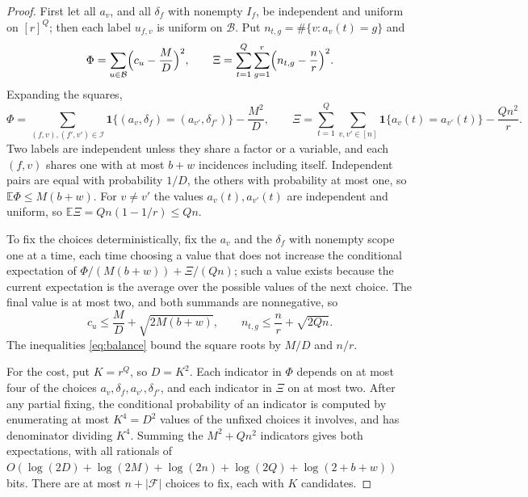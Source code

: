 \documentclass[11pt,reqno]{amsart}
\numberwithin{equation}{section}
\theoremstyle{plain}
\theoremstyle{definition}
\theoremstyle{remark}
\newcommand{\F}{\mathcal{F}}
\newcommand{\B}{\mathcal{B}}
\begin{document}
\begin{proof}
First let all $a_v$, and all $\delta_f$ with nonempty $I_f$, be independent and
uniform on $[r]^{Q}$; then each label $u_{f,v}$ is uniform on $\B$. Put
$n_{t,g}=\#\{v:a_v(t)=g\}$ and
\[
  \Phi=\sum_{u\in\B}\Bigl(c_u-\frac MD\Bigr)^2,\qquad
  \Xi=\sum_{t=1}^{Q}\sum_{g=1}^{r}\Bigl(n_{t,g}-\frac nr\Bigr)^2 .
\]
Expanding the squares,
\[
  \Phi=\sum_{(f,v),(f',v')\in\mathcal I}\mathbf 1\{(a_v,\delta_f)=(a_{v'},\delta_{f'})\}-\frac{M^2}D,\qquad
  \Xi=\sum_{t=1}^{Q}\sum_{v,v'\in[n]}\mathbf 1\{a_v(t)=a_{v'}(t)\}-\frac{Qn^2}r .
\]
Two labels are independent unless they share a factor or a variable, and each
$(f,v)$ shares one with at most $b+w$ incidences including itself. Independent
pairs are equal with probability $1/D$, the others with probability at most one,
so $\mathbb E\Phi\le M(b+w)$. For $v\ne v'$ the values $a_v(t),a_{v'}(t)$ are
independent and uniform, so $\mathbb E\Xi=Qn(1-1/r)\le Qn$.

To fix the choices deterministically, fix the $a_v$ and the $\delta_f$ with
nonempty scope one at a time, each time choosing a value that does not increase
the conditional expectation of $\Phi/(M(b+w))+\Xi/(Qn)$; such a value exists
because the current expectation is the average over the possible values of the
next choice. The final value is at most two, and both summands are nonnegative, so
\[
  c_u\le\frac MD+\sqrt{2M(b+w)},\qquad n_{t,g}\le\frac nr+\sqrt{2Qn}.
\]
The inequalities \eqref{eq:balance} bound the square roots by $M/D$ and $n/r$.

For the cost, put $K=r^{Q}$, so $D=K^2$. Each indicator in $\Phi$ depends on at
most four of the choices $a_v,\delta_f,a_{v'},\delta_{f'}$, and each indicator in
$\Xi$ on at most two. After any partial fixing, the conditional probability of an
indicator is computed by enumerating at most $K^4=D^2$ values of the unfixed
choices it involves, and has denominator dividing $K^4$. Summing the $M^2+Qn^2$
indicators gives both expectations, with all rationals of
$O(\log(2D)+\log(2M)+\log(2n)+\log(2Q)+\log(2+b+w))$ bits. There are at most
$n+|\F|$ choices to fix, each with $K$ candidates.
\end{proof}
\end{document}
